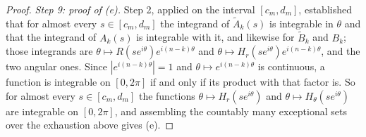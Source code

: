 \begin{proof}
\emph{Step 9: proof of (e).}  Step 2, applied on the interval $[c_m,d_m]$,
established that for almost every $s\in[c_m,d_m]$ the integrand of
$\widetilde A_k(s)$ is integrable in $\theta$ and that the integrand of
$A_k(s)$ is integrable with it, and likewise for $\widetilde B_k$ and $B_k$;
those integrands are $\theta\mapsto R(se^{i\theta})e^{i(n-k)\theta}$ and
$\theta\mapsto H_r(se^{i\theta})e^{i(n-k)\theta}$, and the two angular ones.
Since $|e^{i(n-k)\theta}|=1$ and $\theta\mapsto e^{i(n-k)\theta}$ is
continuous, a function is integrable on $[0,2\pi]$ if and only if its product
with that factor is.  So for almost every $s\in[c_m,d_m]$ the functions
$\theta\mapsto H_r(se^{i\theta})$ and $\theta\mapsto H_\theta(se^{i\theta})$
are integrable on $[0,2\pi]$, and assembling the countably many exceptional
sets over the exhaustion above gives (e).
\end{proof}
